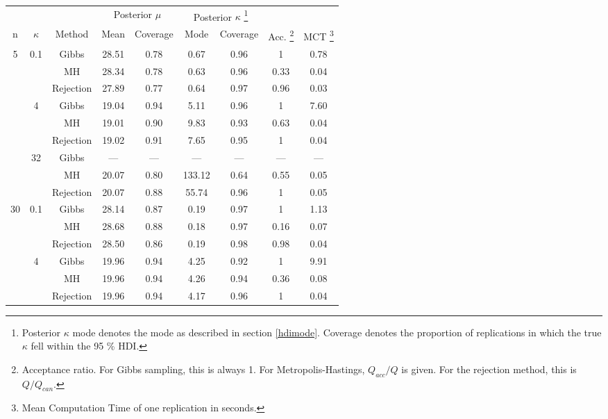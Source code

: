 {\footnotesize
\begin{tabular}{ccccccccc}
  \toprule 
 &&& \multicolumn{2}{c}{Posterior $\mu$} & \multicolumn{2}{c}{Posterior $\kappa$ \footnote{Posterior $\kappa$ mode denotes the mode as described in section \ref{hdimode}. Coverage denotes the proportion of replications in which the true $\kappa$ fell within the 95 \% HDI.} }&  \\
   n & $\kappa$ & Method & Mean & Coverage & Mode & Coverage
                                            & Acc. \footnote{Acceptance ratio. For Gibbs sampling, this is always 1. For Metropolis-Hastings, $Q_{acc}/Q$ is given. For the rejection method, this is $Q/Q_{can}$.} & MCT \footnote{Mean Computation Time of one replication in seconds.} \\
 \midrule 
 5 & 0.1 & Gibbs & 28.51 & 0.78 & 0.67 & 0.96 & 1 & 0.78 \\ 
   &  & MH & 28.34 & 0.78 & 0.63 & 0.96 & 0.33 & 0.04 \\ 
   \vspace{0.2cm} &  & Rejection & 27.89 & 0.77 & 0.64 & 0.97 & 0.96 & 0.03 \\ 
   & 4 & Gibbs & 19.04 & 0.94 & 5.11 & 0.96 & 1 & 7.60 \\ 
   &  & MH & 19.01 & 0.90 & 9.83 & 0.93 & 0.63 & 0.04 \\ 
   \vspace{0.2cm} &  & Rejection & 19.02 & 0.91 & 7.65 & 0.95 & 1 & 0.04 \\ 
   & 32 & Gibbs & --- & --- & --- & --- & --- & --- \\ 
   &  & MH & 20.07 & 0.80 & 133.12 & 0.64 & 0.55 & 0.05 \\ 
   &  & Rejection & 20.07 & 0.88 & 55.74 & 0.96 & 1 & 0.05 \\ 
   \cmidrule{1-9}30 & 0.1 & Gibbs & 28.14 & 0.87 & 0.19 & 0.97 & 1 & 1.13 \\ 
   &  & MH & 28.68 & 0.88 & 0.18 & 0.97 & 0.16 & 0.07 \\ 
   \vspace{0.2cm} &  & Rejection & 28.50 & 0.86 & 0.19 & 0.98 & 0.98 & 0.04 \\ 
   & 4 & Gibbs & 19.96 & 0.94 & 4.25 & 0.92 & 1 & 9.91 \\ 
   &  & MH & 19.96 & 0.94 & 4.26 & 0.94 & 0.36 & 0.08 \\ 
   \vspace{0.2cm} &  & Rejection & 19.96 & 0.94 & 4.17 & 0.96 & 1 & 0.04 \\ 

\end{tabular}}

